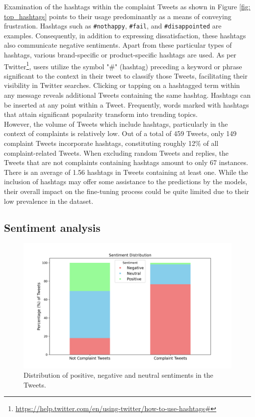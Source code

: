 Examination of the hashtags within the complaint Tweets as shown in Figure \ref{fig: top_hashtags} points to their usage predominantly as a means of conveying frustration. Hashtags such as \texttt{\#nothappy}, \texttt{\#fail}, and \texttt{\#disappointed} are examples. Consequently, in addition to expressing dissatisfaction, these hashtags also communicate negative sentiments. Apart from these particular types of hashtags, various brand-specific or product-specific hashtags are used. As per Twitter\footnote{\url{https://help.twitter.com/en/using-twitter/how-to-use-hashtags#}}, users utilize the symbol "\#" (hashtag) preceding a keyword or phrase significant to the context in their tweet to classify those Tweets, facilitating their visibility in Twitter searches. Clicking or tapping on a hashtagged term within any message reveals additional Tweets containing the same hashtag. Hashtags can be inserted at any point within a Tweet. Frequently, words marked with hashtags that attain significant popularity transform into trending topics. \\

However, the volume of Tweets which include hashtags, particularly in the context of complaints is relatively low. Out of a total of 459 Tweets, only 149 complaint Tweets incorporate hashtags, constituting roughly 12\% of all complaint-related Tweets. When excluding random Tweets and replies, the Tweets that are not complaints containing hashtags amount to only 67 instances. There is an average of 1.56 hashtags in Tweets containing at least one. While the inclusion of hashtags may offer some assistance to the predictions by the models, their overall impact on the fine-tuning process could be quite limited due to their low prevalence in the dataset.\\

\subsection{Sentiment analysis}
\begin{figure}[htb]
    \centering
    \includegraphics[width=12cm]{figures/sentiment.png}
    \vspace*{-3mm}
    \caption{Distribution of positive, negative and neutral sentiments in the Tweets.}
    \label{fig: sentiment}
\end{figure}

